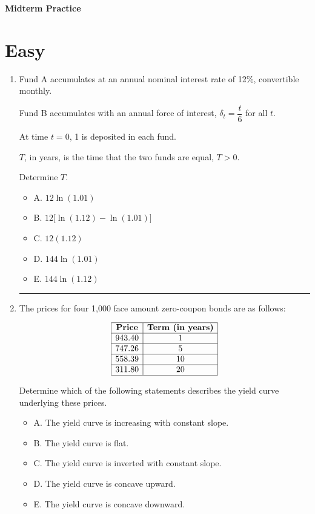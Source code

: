 \documentclass[11pt]{article}
\begin{document}
\begin{center}
{\Large \textbf{Midterm Practice}}\\
\vspace{0.3em}
\end{center}

\section*{Easy}

\begin{enumerate}[label=\textbf{\arabic*.}]

\item Fund A accumulates at an annual nominal interest rate of 12\%, convertible monthly.

Fund B accumulates with an annual force of interest, $\delta_t=\dfrac{t}{6}$ for all $t$.

At time $t=0$, 1 is deposited in each fund.

$T$, in years, is the time that the two funds are equal, $T>0$.

Determine $T$.

\begin{itemize}
\item A. $12\ln(1.01)$
\item B. $12\bigl[\ln(1.12)-\ln(1.01)\bigr]$
\item C. $12(1.12)$
\item D. $144\ln(1.01)$
\item E. $144\ln(1.12)$
\end{itemize}

\medskip
\hrule
\medskip

\item The prices for four 1,000 face amount zero-coupon bonds are as follows:

\[
\begin{array}{|c|c|}
\hline
\textbf{Price} & \textbf{Term (in years)}\\
\hline
943.40 & 1\\
\hline
747.26 & 5\\
\hline
558.39 & 10\\
\hline
311.80 & 20\\
\hline
\end{array}
\]

Determine which of the following statements describes the yield curve underlying these prices.

\begin{itemize}
\item A. The yield curve is increasing with constant slope.
\item B. The yield curve is flat.
\item C. The yield curve is inverted with constant slope.
\item D. The yield curve is concave upward.
\item E. The yield curve is concave downward.
\end{itemize}


\end{enumerate}
\end{document}
